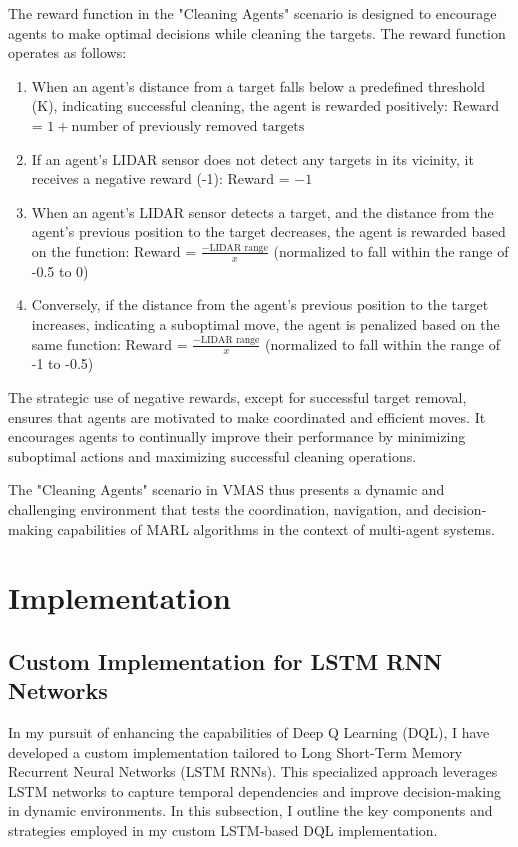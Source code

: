 \documentclass{scrartcl}
\begin{document}
The reward function in the "Cleaning Agents" scenario is designed to encourage agents to make optimal decisions while cleaning the targets. The reward function operates as follows:
\begin{enumerate}
  \item When an agent's distance from a target falls below a predefined threshold (K), indicating successful cleaning, the agent is rewarded positively:
  Reward = $1 + \text{number of previously removed targets}$
  \item If an agent's LIDAR sensor does not detect any targets in its vicinity, it receives a negative reward (-1):
  Reward = $-1$
  \item When an agent's LIDAR sensor detects a target, and the distance from the agent's previous position to the target decreases, the agent is rewarded based on the function:
  Reward = $\frac{-\text{LIDAR range}}{x}$ (normalized to fall within the range of -0.5 to 0)
  \item Conversely, if the distance from the agent's previous position to the target increases, indicating a suboptimal move, the agent is penalized based on the same function:
  Reward = $\frac{-\text{LIDAR range}}{x}$ (normalized to fall within the range of -1 to -0.5)
\end{enumerate}
The strategic use of negative rewards, except for successful target removal, ensures that agents are motivated to make coordinated and efficient moves. It encourages agents to continually improve their performance by minimizing suboptimal actions and maximizing successful cleaning operations.

The "Cleaning Agents" scenario in VMAS thus presents a dynamic and challenging environment that tests the coordination, navigation, and decision-making capabilities of MARL algorithms in the context of multi-agent systems.

\section{Implementation}
\subsection{Custom Implementation for LSTM RNN Networks}

In my pursuit of enhancing the capabilities of Deep Q Learning (DQL), I have developed a custom implementation tailored to 
Long Short-Term Memory Recurrent Neural Networks (LSTM RNNs). This specialized approach leverages LSTM networks to capture temporal 
dependencies and improve decision-making in dynamic environments. In this subsection, I outline the key components and strategies 
employed in my custom LSTM-based DQL implementation.
\end{document}

